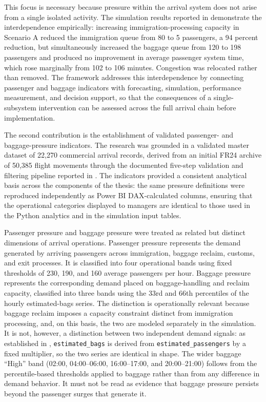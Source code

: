 This focus is necessary because pressure within the arrival system does not arise from a single isolated activity. The simulation results reported in  demonstrate the interdependence empirically: increasing immigration-processing capacity in Scenario A reduced the immigration queue from 80 to 5 passengers, a 94 percent reduction, but simultaneously increased the baggage queue from 120 to 198 passengers and produced no improvement in average passenger system time, which rose marginally from 102 to 106 minutes. Congestion was relocated rather than removed. The framework addresses this interdependence by connecting passenger and baggage indicators with forecasting, simulation, performance measurement, and decision support, so that the consequences of a single-subsystem intervention can be assessed across the full arrival chain before implementation.

The second contribution is the establishment of validated passenger- and baggage-pressure indicators. The research was grounded in a validated master dataset of 22,270 commercial arrival records, derived from an initial FR24 archive of 50,385 flight movements through the documented five-step validation and filtering pipeline reported in . The indicators provided a consistent analytical basis across the components of the thesis: the same pressure definitions were reproduced independently as Power BI DAX-calculated columns, ensuring that the operational categories displayed to managers are identical to those used in the Python analytics and in the simulation input tables.

Passenger pressure and baggage pressure were treated as related but distinct dimensions of arrival operations. Passenger pressure represents the demand generated by arriving passengers across immigration, baggage reclaim, customs, and exit processes. It is classified into four operational bands using fixed thresholds of 230, 190, and 160 average passengers per hour. Baggage pressure represents the corresponding demand placed on baggage-handling and reclaim capacity, classified into three bands using the 33rd and 66th percentiles of the hourly estimated-bags series. The distinction is operationally relevant because baggage reclaim imposes a capacity constraint distinct from immigration processing, and, on this basis, the two are modeled separately in the simulation. It is not, however, a distinction between two independent demand signals: as established in , \nolinkurl{estimated_bags} is derived from \nolinkurl{estimated_passengers} by a fixed multiplier, so the two series are identical in shape. The wider baggage ``High'' band (02:00, 04:00--06:00, 16:00--17:00, and 20:00--21:00) follows from the percentile-based thresholds applied to baggage rather than from any difference in demand behavior. It must not be read as evidence that baggage pressure persists beyond the passenger surges that generate it.

